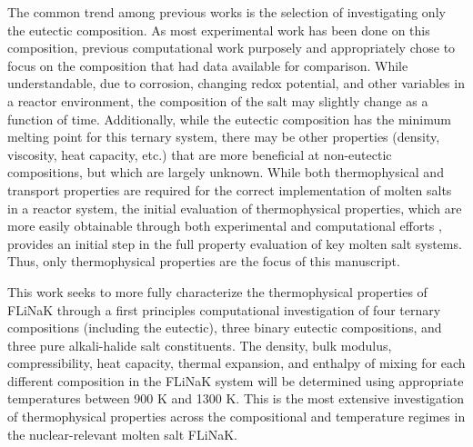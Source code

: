\documentclass[preprint,12pt]{elsarticle}
\providecommand{\DIFadd}[1]{{\protect\color{blue} \sf #1}} %
\providecommand{\DIFaddbegin}{} %
\providecommand{\DIFaddend}{} %
\newcommand{\DIFaddincludegraphics}[2][]{{\color{blue}\fbox{\DIFOincludegraphics[#1]{#2}}}} %
\DeclareRobustCommand{\DIFaddbegin}{\DIFOaddbegin \let\includegraphics\DIFaddincludegraphics} %
\DeclareRobustCommand{\DIFaddend}{\DIFOaddend \let\includegraphics\DIFOincludegraphics} %
\begin{document}
The common trend among previous works is the selection of investigating only the eutectic composition. As most experimental work has been done on this composition, previous computational work purposely and appropriately chose to focus on the composition that had data available for comparison. While understandable, due to corrosion, changing redox potential, and other variables in a reactor environment, the composition of the salt may slightly change as a function of time. Additionally, while the eutectic composition has the minimum melting point for this ternary system, there may be other properties (density, viscosity, heat capacity, etc.) that are more beneficial at non-eutectic compositions, but which are largely unknown\cite{Benes2009}. \DIFaddbegin \DIFadd{While both thermophysical and transport properties are required for the correct implementation of molten salts in a reactor system, the initial evaluation of thermophysical properties, which are more easily obtainable through both experimental and computational efforts \cite{Duemmler2022,Duemmler2023,Zhao2023}, provides an initial step in the full property evaluation of key molten salt systems. Thus, only thermophysical properties are the focus of this manuscript. 
}\DIFaddend 

This work seeks to more fully characterize the thermophysical properties of FLiNaK through a first principles computational investigation of four ternary compositions (including the eutectic), three binary eutectic compositions, and three pure alkali-halide salt constituents. The density, bulk modulus, compressibility, heat capacity, thermal expansion, and enthalpy of mixing for each different composition in the FLiNaK system will be determined using appropriate temperatures between 900 K and 1300 K. This is the most extensive investigation of thermophysical properties across the compositional and temperature regimes in the nuclear-relevant molten salt FLiNaK.
\end{document}
